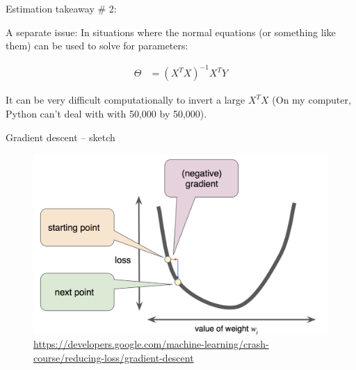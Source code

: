 \documentclass[aspectratio=169]{beamer}
\begin{document}
\begin{frame}{Estimation takeaway \# 2: }

A separate issue: In situations where the normal equations (or something like them) can be used to solve for parameters:

\begin{align*}
\Theta &=  
(X^TX)^{-1}X^TY
\end{align*}

It can be very difficult computationally to invert a large $X^TX$ (On my computer, Python can't deal with with 50,000 by 50,000).  
\end{frame}



\begin{frame}{Gradient descent -- sketch}

\pause
\begin{figure}
\includegraphics[height=0.7\textheight]{grad_desc_google_4}
\caption*{\url{https://developers.google.com/machine-learning/crash-course/reducing-loss/gradient-descent}}
\end{figure}

\end{frame}
\end{document}
